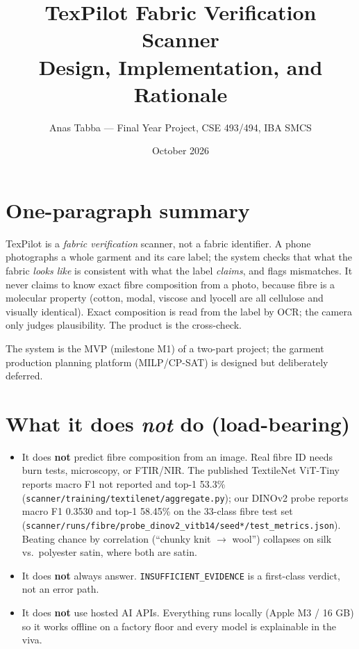 \documentclass[11pt,a4paper]{article}
\title{TexPilot Fabric Verification Scanner\\
\large Design, Implementation, and Rationale}
\author{Anas Tabba --- Final Year Project, CSE 493/494, IBA SMCS}
\date{October 2026}
\begin{document}
\maketitle
\tableofcontents
\newpage

\section{One-paragraph summary}

TexPilot is a \emph{fabric verification} scanner, not a fabric identifier. A phone
photographs a whole garment and its care label; the system checks that what the
fabric \emph{looks like} is consistent with what the label \emph{claims}, and
flags mismatches. It never claims to know exact fibre composition from a photo,
because fibre is a molecular property (cotton, modal, viscose and lyocell are all
cellulose and visually identical). Exact composition is read from the label by OCR;
the camera only judges plausibility. The product is the cross-check.

The system is the MVP (milestone M1) of a two-part project; the garment
production planning platform (MILP/CP-SAT) is designed but deliberately deferred.

\section{What it does \emph{not} do (load-bearing)}

\begin{itemize}[leftmargin=*]
  \item It does \textbf{not} predict fibre composition from an image. Real fibre ID
        needs burn tests, microscopy, or FTIR/NIR. The published TextileNet ViT-Tiny
        reports macro F1 not reported and top-1 53.3\%
        (\texttt{scanner/training/textilenet/aggregate.py}); our DINOv2 probe reports
        macro F1 0.3530 and top-1 58.45\% on the 33-class fibre test set
        (\texttt{scanner/runs/fibre/probe\_dinov2\_vitb14/seed*/test\_metrics.json}).
        Beating chance by correlation (``chunky knit $\to$ wool'')
        collapses on silk vs.\ polyester satin, where both are satin.
  \item It does \textbf{not} always answer. \texttt{INSUFFICIENT\_EVIDENCE} is a
        first-class verdict, not an error path.
  \item It does \textbf{not} use hosted AI APIs. Everything runs locally
        (Apple M3 / 16 GB) so it works offline on a factory floor and every model
        is explainable in the viva.
\end{itemize}
\end{document}
